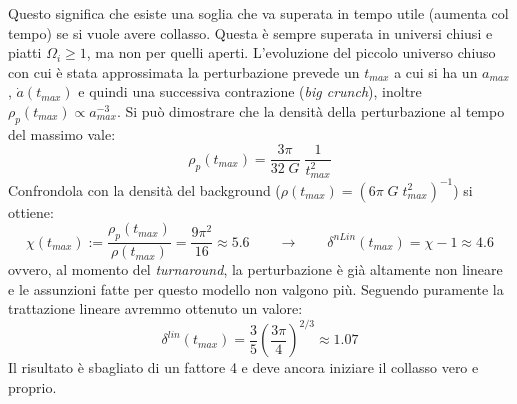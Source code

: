 Questo significa che esiste una soglia che va superata in tempo utile (aumenta col tempo) se si vuole avere collasso. Questa è sempre superata in universi chiusi e piatti $\Omega_i \geq 1$, ma non per quelli aperti. L'evoluzione del piccolo universo chiuso con cui è stata approssimata la perturbazione prevede un $t_{max}$ a cui si ha un $a_{max}$, $\dot{a}(t_{max})$ e quindi una successiva contrazione (\textit{big crunch}), inoltre $\rho_p (t_{max})\propto a_{max}^{-3}$. Si può dimostrare che la densità della perturbazione al tempo del massimo vale:
\begin{equation}
    \rho_p (t_{max})=\frac{3\pi }{32\; G} \; \frac{1}{t_{max}^2}
\end{equation}
Confrondola con la densità del background ($\rho(t_{max})=(6\pi \; G \; t_{max}^2)^{-1}$) si ottiene:
$$
\chi (t_{max}):= \frac{\rho_p(t_{max})}{\rho (t_{max})}= \frac{9\pi^2}{16}\approx 5.6 \qquad \rightarrow\qquad \delta^{nLin} (t_{max})= \chi -1 \approx 4.6
$$
ovvero, al momento del \textit{turnaround}, la perturbazione è già altamente non lineare e le assunzioni fatte per questo modello non valgono più. Seguendo puramente la trattazione lineare avremmo ottenuto un valore:
$$
\delta^{lin}(t_{max})=\frac{3}{5} \left(\frac{3\pi}{4}\right)^{2/3}\approx 1.07
$$
Il risultato è sbagliato di un fattore 4 e deve ancora iniziare il collasso vero e proprio.



